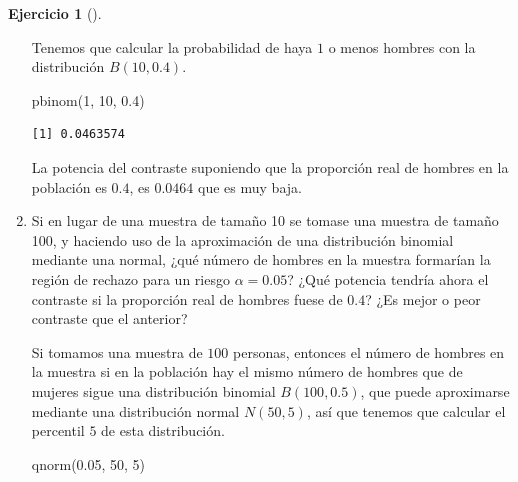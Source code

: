 \documentclass[
  a4paper,
]{scrreport}
\newenvironment{Shaded}{\begin{snugshade}}{\end{snugshade}}
\newcommand{\DecValTok}[1]{\textcolor[rgb]{0.68,0.00,0.00}{#1}}
\newcommand{\FloatTok}[1]{\textcolor[rgb]{0.68,0.00,0.00}{#1}}
\newcommand{\FunctionTok}[1]{\textcolor[rgb]{0.28,0.35,0.67}{#1}}
\newcommand{\NormalTok}[1]{\textcolor[rgb]{0.00,0.23,0.31}{#1}}
\theoremstyle{definition}
\newtheorem{exercise}{Ejercicio}[chapter]
\theoremstyle{remark}
\begin{document}
\begin{exercise}[]
\begin{enumerate}
\begin{tcolorbox}
  Tenemos que calcular la probabilidad de haya \(1\) o menos hombres con
  la distribución \(B(10, 0.4)\).

\begin{Shaded}
\begin{Highlighting}[]
\FunctionTok{pbinom}\NormalTok{(}\DecValTok{1}\NormalTok{, }\DecValTok{10}\NormalTok{, }\FloatTok{0.4}\NormalTok{)}
\end{Highlighting}
\end{Shaded}

\begin{verbatim}
[1] 0.0463574
\end{verbatim}

  La potencia del contraste suponiendo que la proporción real de hombres
  en la población es \(0.4\), es \(0.0464\) que es muy baja.

  \end{tcolorbox}
\item
  Si en lugar de una muestra de tamaño 10 se tomase una muestra de
  tamaño 100, y haciendo uso de la aproximación de una distribución
  binomial mediante una normal, ¿qué número de hombres en la muestra
  formarían la región de rechazo para un riesgo \(\alpha=0.05\)? ¿Qué
  potencia tendría ahora el contraste si la proporción real de hombres
  fuese de \(0.4\)? ¿Es mejor o peor contraste que el anterior?

  \begin{tcolorbox}[enhanced jigsaw, breakable, toptitle=1mm, colbacktitle=quarto-callout-tip-color!10!white, rightrule=.15mm, opacityback=0, opacitybacktitle=0.6, titlerule=0mm, coltitle=black, colframe=quarto-callout-tip-color-frame, colback=white, bottomtitle=1mm, leftrule=.75mm, toprule=.15mm, title=\textcolor{quarto-callout-tip-color}{\faLightbulb}\hspace{0.5em}{Solución}, arc=.35mm, bottomrule=.15mm, left=2mm]

  Si tomamos una muestra de \(100\) personas, entonces el número de
  hombres en la muestra si en la población hay el mismo número de
  hombres que de mujeres sigue una distribución binomial \(B(100,0.5)\),
  que puede aproximarse mediante una distribución normal \(N(50,5)\),
  así que tenemos que calcular el percentil \(5\) de esta distribución.

\begin{Shaded}
\begin{Highlighting}[]
\FunctionTok{qnorm}\NormalTok{(}\FloatTok{0.05}\NormalTok{, }\DecValTok{50}\NormalTok{, }\DecValTok{5}\NormalTok{)}
\end{Highlighting}
\end{Shaded}


\end{tcolorbox}
\end{enumerate}
\end{exercise}
\end{document}

